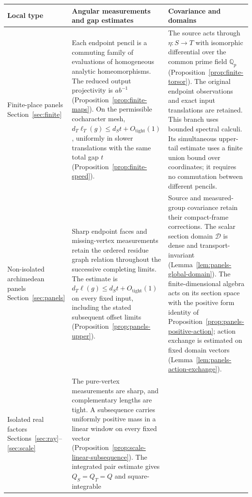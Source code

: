 \begin{table}[!htbp]
\centering
\footnotesize
\setlength{\tabcolsep}{3pt}
\renewcommand{\arraystretch}{1.15}
\begin{tabular}{@{}>{\raggedright\arraybackslash}p{22mm}>{\raggedright\arraybackslash}p{58mm}>{\raggedright\arraybackslash}p{57mm}@{}}
\toprule
Local type & Angular measurements and gap estimates & Covariance and domains \\
\midrule
Finite-place panels
\newline Section~\ref{sec:finite}
&
Each endpoint pencil is a commuting family of evaluations of homogeneous
analytic homeomorphisms. The reduced output projectivity is $ab^{-1}$
(Proposition~\ref{prop:finite-maps}). On the permissible cocharacter mesh,
$d_T\ell_T(g)\le d_St+O_{\mathrm{tight}}(1)$, uniformly in slower
translations with the same total gap $t$
(Proposition~\ref{prop:finite-speed}).
&
The source acts through $\eta:S\to T$ with isomorphic differential
over the common prime field $\mathbb Q_p$
(Proposition~\ref{prop:finite-torsor}). The original endpoint observations
and exact input translations are retained. This branch uses bounded
spectral calculi. Its simultaneous upper-tail estimate uses a finite union
bound over coordinates; it requires no commutation between different
pencils.\\[5pt]
Non-isolated archimedean panels
\newline Section~\ref{sec:panels}
&
Sharp endpoint faces and missing-vertex measurements retain the ordered
residue graph relation throughout the successive completing limits.
The estimate is $d_T\ell(g)\le d_St+O_{\mathrm{tight}}(1)$ on every fixed
input, including the stated subsequent offset limits
(Proposition~\ref{prop:panels-upper}).
&
Source and measured-group covariance retain their compact-frame
corrections. The scalar section domain $\mathscr D$ is dense and
transport-invariant (Lemma~\ref{lem:panels-global-domain}). The
finite-dimensional algebra acts on its section space with the positive
form identity of Proposition~\ref{prop:panels-positive-action}; action
exchange is estimated on fixed domain vectors
(Lemma~\ref{lem:panels-action-exchange}).\\[5pt]
Isolated real factors
\newline Sections~\ref{sec:ray}--\ref{sec:scale}
&
The pure-vertex measurements are sharp, and complementary lengths are
tight. A subsequence carries uniformly positive mass in a linear window
on every fixed vector (Proposition~\ref{prop:scale-linear-subsequence}).
The integrated pair estimate gives $Q_S=Q_T=Q$ and square-integrable

\end{tabular}
\end{table}
